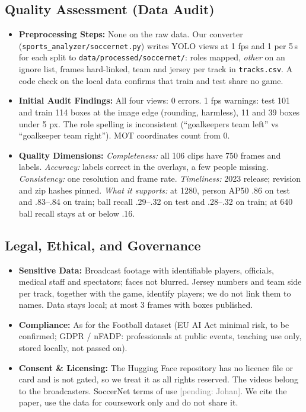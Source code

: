 \documentclass[11pt, a4paper]{article}
\newcommand{\pending}[1]{\textcolor{gray}{[pending: #1]}}
\begin{document}
\subsection{Quality Assessment (Data Audit)}
\begin{itemize}
    \item \textbf{Preprocessing Steps:} None on the raw data. Our converter (\texttt{sports\_analyzer/}\allowbreak\texttt{soccernet.py}) writes YOLO views at 1 fps and 1 per 5\,s for each split to \texttt{data/processed/}\allowbreak\texttt{soccernet/}: roles mapped, \emph{other} on an ignore list, frames hard-linked, team and jersey per track in \texttt{tracks.csv}. A code check on the local data confirms that train and test share no game.
    \item \textbf{Initial Audit Findings:} All four views: 0 errors. 1 fps warnings: test 101 and train 114 boxes at the image edge (rounding, harmless), 11 and 39 boxes under 5 px. The role spelling is inconsistent (``goalkeepers team left'' vs ``goalkeeper team right''). MOT coordinates count from 0.
    \item \textbf{Quality Dimensions:} \emph{Completeness:} all 106 clips have 750 frames and labels. \emph{Accuracy:} labels correct in the overlays, a few people missing. \emph{Consistency:} one resolution and frame rate. \emph{Timeliness:} 2023 release; revision and zip hashes pinned. \emph{What it supports:} at 1280, person AP50 .86 on test and .83--.84 on train; ball recall .29--.32 on test and .28--.32 on train; at 640 ball recall stays at or below .16.
\end{itemize}

\subsection{Legal, Ethical, and Governance}
\begin{itemize}
    \item \textbf{Sensitive Data:} Broadcast footage with identifiable players, officials, medical staff and spectators; faces not blurred. Jersey numbers and team side per track, together with the game, identify players; we do not link them to names. Data stays local; at most 3 frames with boxes published.
    \item \textbf{Compliance:} As for the Football dataset (EU AI Act minimal risk, to be confirmed; GDPR / nFADP: professionals at public events, teaching use only, stored locally, not passed on).
    \item \textbf{Consent \& Licensing:} The Hugging Face repository has no licence file or card and is not gated, so we treat it as all rights reserved. The videos belong to the broadcasters. SoccerNet terms of use \pending{Johan}. We cite the paper, use the data for coursework only and do not share it.
\end{itemize}
\end{document}
